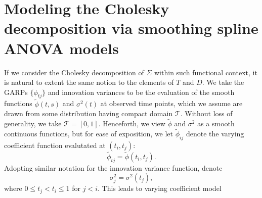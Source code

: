 \chapter{Modeling the Cholesky decomposition via smoothing spline ANOVA models} \label{chapter-2}
%
%
%
%


If we consider the Cholesky decomposition of $\Sigma$ within such functional context, it is natural to extent the same notion to the elements of $T$ and $D$. We take the GARPs $\lbrace \phi_{tj} \rbrace$ and innovation variances to be the evaluation of the smooth functions $\tilde{\phi}\left(t,s\right)$ and $\sigma^2\left(t\right)$ at observed time points, which we assume  are drawn from some distribution having compact domain $\mathcal{T}$. Without loss of generality, we take $\mathcal{T} = \left[0,1\right]$. Henceforth, we view $\tilde{\phi}$ and $\sigma^2$ as a smooth continuous functions, but for ease of exposition, we let $\tilde{\phi}_{ij}$ denote the varying coefficient function evalutated at $\left(t_i,t_j\right)$: 
\[
\tilde{\phi}_{tj} = \tilde{\phi}\left(t_{i},t_{j}\right). 
\]
Adopting similar notation for the innovation variance function, denote
\[
\sigma_{j}^2 = \sigma^2\left(t_{j}\right),
\]
where $0 \le t_{j} < t_{i} \le 1$ for $j < i$. This leads to varying coefficient model

